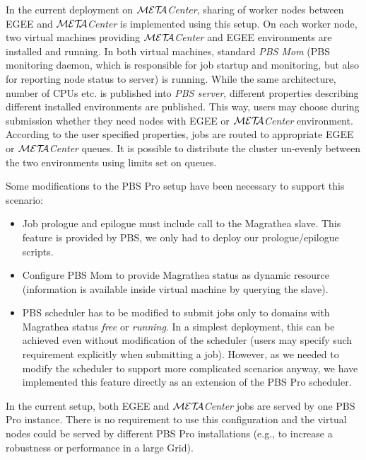 \documentclass[a4paper]{article}
\def\META#1{\textit{${\cal MET\!\!A}$#1}}
\begin{document}
In the current deployment on \META{Center}, sharing of worker nodes between
EGEE and \META{Center} is implemented using this setup. On each worker node,
two virtual machines providing \META{Center} and EGEE environments are
installed and running. In both virtual machines, standard \textit{PBS Mom}
(PBS monitoring daemon, which is responsible for job startup and monitoring,
but also for reporting node status to server) is running. While the same
architecture, number of CPUs etc. is published into \textit{PBS server},
different properties describing different installed environments are
published. This way, users may choose during submission whether they need
nodes with EGEE or \META{Center} environment. According to the user specified
properties, jobs are routed to appropriate EGEE or \META{Center} queues. It is
possible to distribute the cluster un-evenly between the two environments
using limits set on queues.

Some modifications to the PBS Pro setup have been necessary to support this
scenario:

\begin{itemize}

\item Job prologue and epilogue must include call to the Magrathea slave. This
feature is provided by PBS, we only had to deploy our prologue/epilogue
scripts.

\item Configure PBS Mom to provide Magrathea status as dynamic resource
(information is available inside virtual machine by querying the slave).

\item PBS scheduler has to be modified to submit jobs only to domains with
Magrathea status \emph{free} or \emph{running}. In a simplest deployment, this
can be achieved even without modification of the scheduler (users may specify
such requirement explicitly when submitting a job).  However, as we needed to
modify the scheduler to support more complicated scenarios anyway, we have
implemented this feature directly as an extension of the PBS Pro scheduler.

\end{itemize}

In the current setup, both EGEE and \META{Center} jobs are served by one
PBS Pro instance. There is no requirement to use this configuration and the
virtual nodes could be served by different PBS Pro installations (e.g., to
increase a robustness or performance in a large Grid).
\end{document}
